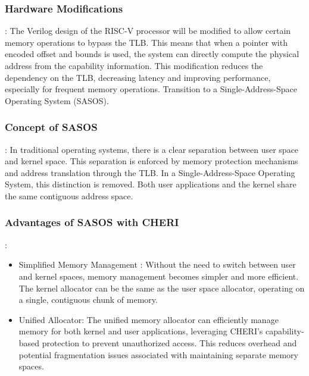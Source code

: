 \subsubsection{Hardware Modifications}:
The Verilog design of the RISC-V processor will be modified to allow certain memory operations to bypass the TLB. This means that when a pointer with encoded offset and bounds is used, the system can directly compute the physical address from the capability information.
This modification reduces the dependency on the TLB, decreasing latency and improving performance, especially for frequent memory operations.
Transition to a Single-Address-Space Operating System (SASOS).
\subsubsection{Concept of SASOS}:
In traditional operating systems, there is a clear separation between user space and kernel space. This separation is enforced by memory protection mechanisms and address translation through the TLB.
In a Single-Address-Space Operating System, this distinction is removed. Both user applications and the kernel share the same contiguous address space.
\subsubsection{Advantages of SASOS with CHERI}:
\begin{itemize}
  \item Simplified Memory Management : Without the need to switch between user and kernel spaces, memory management becomes simpler and more efficient.
The kernel allocator can be the same as the user space allocator, operating on a single, contiguous chunk of memory.
  \item Unified Allocator: The unified memory allocator can efficiently manage memory for both kernel and user applications, leveraging CHERI's capability-based protection to prevent unauthorized access.
This reduces overhead and potential fragmentation issues associated with maintaining separate memory spaces.
\end{itemize}